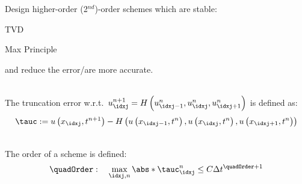 \begin{sectionbox}[Goal]\nospacing
    Design higher-order (2$^{nd}$)-order schemes which are stable:
    \begin{itemizenosep}
        \item TVD
        \item Max Principle
    \end{itemizenosep}
    and reduce the error/are more accurate.
\end{sectionbox}
\begin{defnbox}\nospacing
    \begin{defn}\label{defn:truncation_error}\leavevmode\\
        The truncation error w.r.t.\ $u_{\idxj}^{n+1}=H\left(u_{\idxj-1}^{n},u_{\idxj}^{n},u_{\idxj+1}^{n}\right)$
        is defined as:
        \begin{align}
          \tauc:=u \left(x_{\idxj},t^{n+1}\right)-
          H \left(u \left(x_{\idxj-1},t^{n}\right),u \left(x_{\idxj},t^{n}\right),u \left(x_{\idxj+1},t^{n}\right)\right)
        \end{align}
    \end{defn}
\end{defnbox}
\begin{defnbox}\nospacing
    \begin{defn}\label{defn:order_of_scheme}\leavevmode\\
        The order of a scheme is defined:
        \begin{align}
          \quadOrder:\quad\max_{\idxj,n}\abs*{\tauc_{\idxj}^{n}}\leq C\Delta t^{\quadOrder+1}
        \end{align}
    \end{defn}
\end{defnbox}
